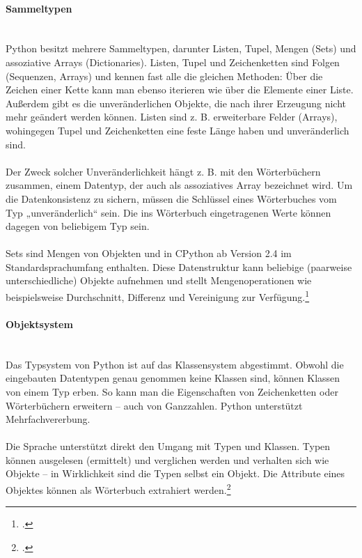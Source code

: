 \paragraph{Sammeltypen}\ \\
Python besitzt mehrere Sammeltypen, darunter Listen, Tupel, Mengen (Sets) und assoziative Arrays (Dictionaries). Listen, Tupel und Zeichenketten sind Folgen (Sequenzen, Arrays) und kennen fast alle die gleichen Methoden: Über die Zeichen einer Kette kann man ebenso iterieren wie über die Elemente einer Liste. Außerdem gibt es die unveränderlichen Objekte, die nach ihrer Erzeugung nicht mehr geändert werden können. Listen sind z. B. erweiterbare Felder (Arrays), wohingegen Tupel und Zeichenketten eine feste Länge haben und unveränderlich sind.\\
\\
Der Zweck solcher Unveränderlichkeit hängt z. B. mit den Wörterbüchern zusammen, einem Datentyp, der auch als assoziatives Array bezeichnet wird. Um die Datenkonsistenz zu sichern, müssen die Schlüssel eines Wörterbuches vom Typ „unveränderlich“ sein. Die ins Wörterbuch eingetragenen Werte können dagegen von beliebigem Typ sein.\\
\\
Sets sind Mengen von Objekten und in CPython ab Version 2.4 im Standardsprachumfang enthalten. Diese Datenstruktur kann beliebige (paarweise unterschiedliche) Objekte aufnehmen und stellt Mengenoperationen wie beispielsweise Durchschnitt, Differenz und Vereinigung zur Verfügung.\footcite{python_wiki}

\paragraph{Objektsystem}\ \\

Das Typsystem von Python ist auf das Klassensystem abgestimmt. Obwohl die eingebauten Datentypen genau genommen keine Klassen sind, können Klassen von einem Typ erben. So kann man die Eigenschaften von Zeichenketten oder Wörterbüchern erweitern – auch von Ganzzahlen. Python unterstützt Mehrfachvererbung.\\
\\
Die Sprache unterstützt direkt den Umgang mit Typen und Klassen. Typen können ausgelesen (ermittelt) und verglichen werden und verhalten sich wie Objekte – in Wirklichkeit sind die Typen selbst ein Objekt. Die Attribute eines Objektes können als Wörterbuch extrahiert werden.\footcite{python_wiki}

